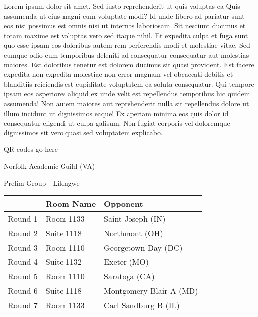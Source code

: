 \documentclass{article}%
\begin{document}
\vspace*{8pt}%
\linebreak%
\newline%
\newline%
Lorem ipsum dolor sit amet. Sed iusto reprehenderit ut quis voluptas ea Quis assumenda ut eius magni eum voluptate modi? Id unde libero ad pariatur sunt eos nisi possimus est omnis nisi ut internos laboriosam. Sit nesciunt ducimus et totam maxime est voluptas vero sed itaque nihil. Et expedita culpa et fuga sunt quo esse ipsam eos doloribus autem rem perferendis modi et molestiae vitae.\newline%
\newline%
Sed cumque odio eum temporibus deleniti ad consequatur consequatur aut molestias maiores. Est doloribus tenetur est dolorem ducimus sit quasi provident. Est facere expedita non expedita molestiae non error magnam vel obcaecati debitis et blanditiis reiciendis est cupiditate voluptatem ea soluta consequatur. Qui tempore ipsam eos asperiores aliquid ex unde velit est repellendus temporibus hic quidem assumenda!\newline%
\newline%
Non autem maiores aut reprehenderit nulla sit repellendus dolore ut illum incidunt ut dignissimos eaque! Ex aperiam minima eos quis dolor id consequatur eligendi ut culpa galisum. Non fugiat corporis vel doloremque dignissimos sit vero quasi sed voluptatem explicabo.\newline%
\newline%
%
\vspace*{30pt}%
\begin{center}%
\begin{Huge}%
QR codes go here%
\end{Huge}%
\end{center}%
\newpage%
%
\begin{center}%
\begin{Huge}%
Norfolk Academic Guild (VA)%
\end{Huge}%
\vspace*{8pt}%
\linebreak%
\begin{Large}%
Prelim Group {-} Lilongwe%
\end{Large}%
\end{center}%
\begin{tabularx}{\textwidth}{|c|Y|Y|}%
\hline%
&Room Name&Opponent\\%
\hline%
Round 1&Room 1133&Saint Joseph (IN)\\%
Round 2&Suite 1118&Northmont (OH)\\%
Round 3&Room 1110&Georgetown Day (DC)\\%
Round 4&Suite 1132&Exeter (MO)\\%
Round 5&Room 1110&Saratoga (CA)\\%
Round 6&Suite 1118&Montgomery Blair A (MD)\\%
Round 7&Room 1133&Carl Sandburg B (IL)\\%
\hline%
\end{tabularx}%
\end{document}
